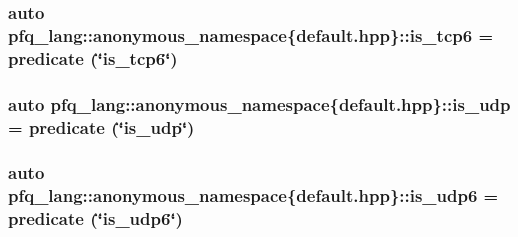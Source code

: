 \hypertarget{namespacepfq__lang_1_1anonymous__namespace_02default_8hpp_03_a096d3a0faa81e83be5cfeb025526275d}{
\subsubsection[{is\+\_\+tcp6}]{\setlength{\rightskip}{0pt plus 5cm}auto pfq\+\_\+lang\+::anonymous\+\_\+namespace\{default.\+hpp\}\+::is\+\_\+tcp6 = {\bf predicate} (\char`\"{}is\+\_\+tcp6\char`\"{})}}\label{namespacepfq__lang_1_1anonymous__namespace_02default_8hpp_03_a096d3a0faa81e83be5cfeb025526275d}
\hypertarget{namespacepfq__lang_1_1anonymous__namespace_02default_8hpp_03_a120b37089690955fc25203beb98f0fe7}{
\subsubsection[{is\+\_\+udp}]{\setlength{\rightskip}{0pt plus 5cm}auto pfq\+\_\+lang\+::anonymous\+\_\+namespace\{default.\+hpp\}\+::is\+\_\+udp = {\bf predicate} (\char`\"{}is\+\_\+udp\char`\"{})}}\label{namespacepfq__lang_1_1anonymous__namespace_02default_8hpp_03_a120b37089690955fc25203beb98f0fe7}
\hypertarget{namespacepfq__lang_1_1anonymous__namespace_02default_8hpp_03_a31e93829d19f72f4aece81f57d7cef9c}{
\subsubsection[{is\+\_\+udp6}]{\setlength{\rightskip}{0pt plus 5cm}auto pfq\+\_\+lang\+::anonymous\+\_\+namespace\{default.\+hpp\}\+::is\+\_\+udp6 = {\bf predicate} (\char`\"{}is\+\_\+udp6\char`\"{})}}\label{namespacepfq__lang_1_1anonymous__namespace_02default_8hpp_03_a31e93829d19f72f4aece81f57d7cef9c}
